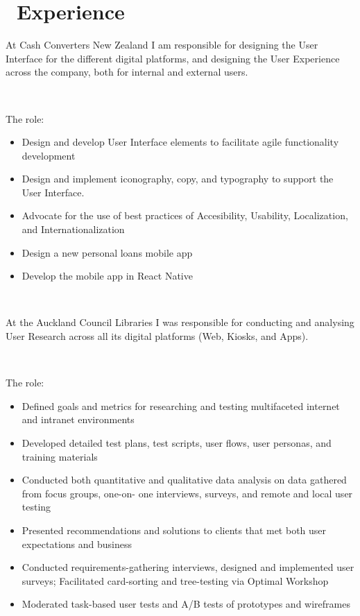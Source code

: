 \documentclass{resume}
\begin{document}
\section{\faUsers\ Experience}
  At Cash Converters New Zealand I am responsible for designing the User Interface for the different digital platforms, and designing the User Experience across the company, both for internal and external users.\par
  ~\par
  {The role:}\par
  \begin{itemize}
    \item Design and develop User Interface elements to facilitate agile functionality development
    \item Design and implement iconography, copy, and typography to support the User Interface.
    \item Advocate for the use of best practices of Accesibility, Usability, Localization, and Internationalization
    \item Design a new personal loans mobile app
    \item Develop the mobile app in React Native
  \end{itemize}
  ~\par
{}
  At the Auckland Council Libraries I was responsible for conducting and analysing User Research across all its digital platforms (Web, Kiosks, and Apps).\par
  ~\par
  {The role:}\par
  \begin{itemize}
    \item Defined goals and metrics for researching and testing multifaceted internet and intranet environments
    \item Developed detailed test plans, test scripts, user flows, user personas, and training materials
    \item Conducted both quantitative and qualitative data analysis on data gathered from focus groups, one-on- one interviews, surveys, and remote and local user testing
    \item Presented recommendations and solutions to clients that met both user expectations and business
    \item Conducted requirements-gathering interviews, designed and implemented user surveys; Facilitated card-sorting and tree-testing via Optimal Workshop
    \item Moderated task-based user tests and A/B tests of prototypes and wireframes
  \end{itemize}
\end{document}
